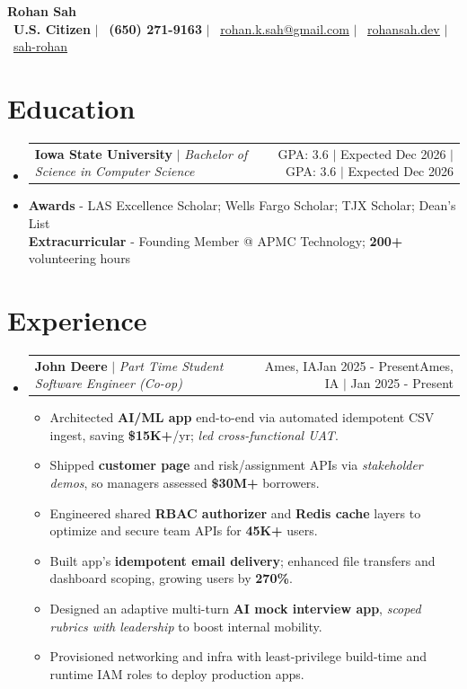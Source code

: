 \documentclass[11pt]{article}
\makeatletter
\newcommand{\resumeItem}[1]{
  \item\small{{#1\vspace{0pt}}}
}
\newcommand{\resumeSubheading}[4]{
  \item
    \begin{tabular*}{0.97\textwidth}[t]{l@{\extracolsep{\fill}}r}
      {\textbf{#1} $|$  #3} & \ifx\relax#4\relax #2\else #4 $|$ #2\fi \\
    \end{tabular*}\vspace{-6pt}
}
\newcommand{\resumeSubHeadingListStart}{\begin{itemize}[leftmargin=-0in, label={}]}
\newcommand{\resumeSubHeadingListEnd}{\end{itemize}}
\newcommand{\resumeItemListStart}{\begin{itemize}[itemsep=4pt, parsep=0pt, topsep=6pt]}
\newcommand{\resumeItemListEnd}{\end{itemize}\vspace{-5pt}}
\makeatother
\begin{document}
\begin{center}
    \textbf{\Huge Rohan Sah} \\
    \vspace{6pt}
    \footnotesize
    \faFlagUsa\ \textbf{U.S. Citizen} $|$
    \faPhone\ \textbf{(650) 271-9163} $|$
    \faEnvelope\ \href{mailto:rohan.k.sah@gmail.com}{\underline{\color{blue}rohan.k.sah@gmail.com}} $|$
    \faGlobe\ \href{https://rohansah.dev}{\underline{\color{blue}rohansah.dev}} $|$
    \faGithub\ \href{https://github.com/sah-rohan}{\underline{\color{blue}sah-rohan}}
\end{center}
\section{Education}
  \resumeSubHeadingListStart
    \resumeSubheading
      {Iowa State University}{GPA: 3.6 $|$ Expected Dec 2026}
      {\emph{Bachelor of Science in Computer Science}}{}
    \resumeItem{\small \textbf{Awards} - LAS Excellence Scholar; Wells Fargo Scholar; TJX Scholar; Dean's List\\[2pt]
    \textbf{Extracurricular} - Founding Member @ APMC Technology; \textbf{200+} volunteering hours}
\vspace{-2pt}
  \resumeSubHeadingListEnd
\section{Experience}
\resumeSubHeadingListStart
  \resumeSubheading
    {John Deere}{Jan 2025 - Present}
    {\emph{Part Time Student Software Engineer (Co-op)}}{Ames, IA}
    \resumeItemListStart
        \resumeItem{Architected \textbf{AI/ML app} end-to-end via automated idempotent CSV ingest, saving \textbf{\$15K+}/yr; \emph{led cross-functional UAT}.}
       \resumeItem{Shipped \textbf{customer page} and risk/assignment APIs via \emph{stakeholder demos}, so managers assessed \textbf{\$30M+} borrowers.}
         \resumeItem{Engineered shared \textbf{RBAC authorizer} and \textbf{Redis cache} layers to optimize and secure team APIs for \textbf{45K+} users.}
      \resumeItem{Built app's \textbf{idempotent email delivery}; enhanced file transfers and dashboard scoping, growing users by \textbf{270\%}.}
      \resumeItem{Designed an adaptive multi-turn \textbf{AI mock interview app}, \emph{scoped rubrics with leadership} to boost internal mobility.}
       \resumeItem{Provisioned networking and infra with least-privilege build-time and runtime IAM roles to deploy production apps.}
    \resumeItemListEnd
\vspace{0pt}
\resumeSubHeadingListEnd
\end{document}
